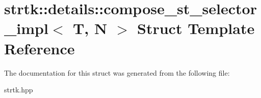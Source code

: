 \hypertarget{structstrtk_1_1details_1_1compose__st__selector__impl}{\section{strtk\-:\-:details\-:\-:compose\-\_\-st\-\_\-selector\-\_\-impl$<$ T, N $>$ Struct Template Reference}
\label{structstrtk_1_1details_1_1compose__st__selector__impl}
}


The documentation for this struct was generated from the following file\-:\begin{DoxyCompactItemize}
\item 
strtk.\-hpp\end{DoxyCompactItemize}
